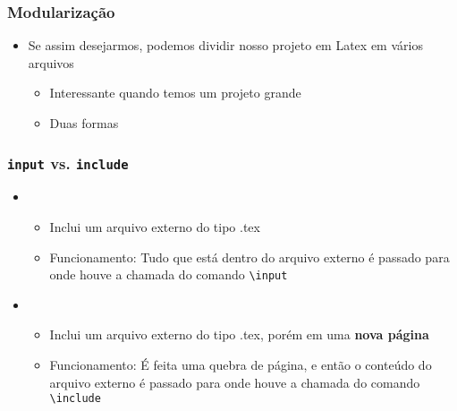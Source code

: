 \begin{frame}[fragile] \frametitle{Modularização}
\begin{itemize}
	\item Se assim desejarmos, podemos dividir nosso projeto em Latex em vários arquivos
	\begin{itemize}
		\item Interessante quando temos um projeto grande
		\item Duas formas
	\end{itemize}
\end{itemize}
\end{frame}

\begin{frame}[fragile] \frametitle{\texttt{input} vs. \texttt{include}}
\begin{itemize}
	\item {}
	\begin{itemize}
		\item Inclui um arquivo externo do tipo .tex
		\item Funcionamento: Tudo que está dentro do arquivo externo é passado para onde houve a chamada do comando \texttt{\textbackslash{}input}
	\end{itemize}
	\item {}
	\begin{itemize}
		\item Inclui um arquivo externo do tipo .tex, porém em uma \textbf{nova página}
		\item Funcionamento: É feita uma quebra de página, e então o conteúdo do arquivo externo é passado para onde houve a chamada do comando \texttt{\textbackslash{}include}	
	\end{itemize}
\end{itemize}
\end{frame}